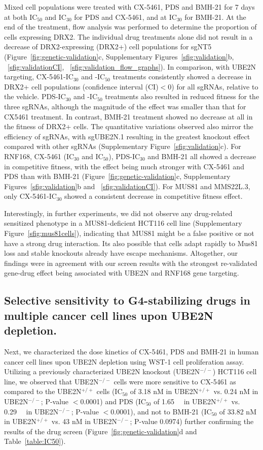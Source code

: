 Mixed cell populations were treated with CX-5461, PDS and BMH-21 for 7 days at both IC$_{50}$ and IC$_{30}$ for PDS and CX-5461, and at IC$_{30}$ for BMH-21. 
At the end of the treatment, flow analysis was performed to determine the proportion of cells expressing DRX2. 
The individual drug treatments alone did not result in a decrease of DRX2-expressing (DRX2+) cell populations for sgNT5 (Figure~\ref{fig:genetic-validation}c, Supplementary Figures~\ref{sfig:validation}b, ~\ref{sfig:validationCI}, ~\ref{sfig:validation_flow_graphs}). 
In comparison, with UBE2N targeting, CX-5461-IC$_{30}$ and -IC$_{50}$ treatments consistently showed a decrease in DRX2+ cell populations (confidence interval (CI)$<$0) for all sgRNAs, relative to the vehicle. 
PDS-IC$_{30}$ and -IC$_{50}$ treatments also resulted in reduced fitness for the three sgRNAs, although the magnitude of the effect was smaller than that for CX5461 treatment.
In contrast, BMH-21 treatment showed no decrease at all in the fitness of DRX2+ cells.
The quantitative variations observed also mirror the efficiency of sgRNAs, with sgUBE2N.1 resulting in the greatest knockout effect compared with other sgRNAs (Supplementary Figure~\ref{sfig:validation}c).
For RNF168, CX-5461 (IC$_{30}$ and IC$_{50}$), PDS-IC$_{30}$ and BMH-21 all showed a decrease in competitive fitness, with the effect being much stronger with CX-5461 and PDS than with BMH-21 (Figure~\ref{fig:genetic-validation}c, Supplementary Figures~\ref{sfig:validation}b and ~\ref{sfig:validationCI}). 
For MUS81 and MMS22L.3, only CX-5461-IC$_{30}$ showed a consistent decrease in competitive fitness effect.

Interestingly, in further experiments, we did not observe any drug-related sensitized phenotype in a MUS81-deficient HCT116 cell line (Supplementary Figure~\ref{sfig:mus81cells}), indicating that MUS81 might be a false positive or not have a strong drug interaction. 
Its also possible that cells adapt rapidly to Mus81 loss and stable knockouts already have escape mechanisms. 
Altogether, our findings were in agreement with our screen results with the strongest re-validated gene-drug effect being associated with UBE2N and RNF168 gene targeting. 

\subsection{Selective sensitivity to G4-stabilizing drugs in multiple cancer cell lines upon UBE2N depletion.}
Next, we characterized the dose kinetics of CX-5461, PDS and BMH-21 in human cancer cell lines upon UBE2N depletion using WST-1 cell proliferation assay. 
Utilizing a previously characterized UBE2N knockout (UBE2N$^{-/-}$) HCT116 cell line\cite{Thorslund2015}, we observed that UBE2N$^{-/-}$ cells were more sensitive to CX-5461 as compared to the UBE2N$^{+/+}$ cells (IC$_{50}$ of 3.18 nM in UBE2N$^{+/+}$ vs. 0.24 nM in UBE2N$^{-/-}$; P-value $<$0.0001) and PDS (IC$_{50}$ of \SI{1.65}{\micro\Molar} in UBE2N$^{+/+}$ vs. \SI{0.29}{\micro\Molar} in UBE2N$^{-/-}$; P-value $<$0.0001), and not to BMH-21 (IC$_{50}$ of 33.82 nM in UBE2N$^{+/+}$ vs. 43 nM in UBE2N$^{-/-}$; P-value 0.0974) further confirming the results of the drug screen (Figure~\ref{fig:genetic-validation}d and Table~\ref{table:IC50}).

